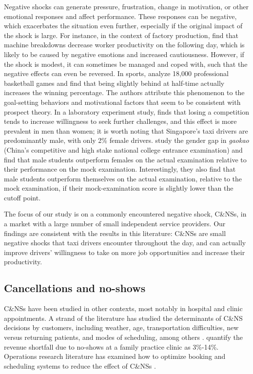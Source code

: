 \documentclass[reviewmode]{restud}
\begin{document}
Negative shocks can generate pressure, frustration, change in motivation, or other emotional responses and affect performance.  These responses can be negative, which exacerbates the situation even further, especially if the original impact of the shock is large. For instance, in the context of factory production, \citet{cai2017recover} find that machine breakdowns decrease worker productivity on the following day, which is likely to be caused by negative emotions and increased cautiousness. However, if the shock is modest, it can sometimes be managed and coped with, such that the negative effects can even be reversed. In sports, \citet{berger2011can} analyze 18,000 professional basketball games and find that being slightly behind at half-time actually increases the winning percentage. The authors attribute this phenomenon to the goal-setting behaviors and motivational factors that seem to be consistent with prospect theory. In a laboratory experiment study, \citet{buser2016impact}  finds that losing a competition tends to increase willingness to seek further challenges, and this effect is more prevalent in men than women; it is worth noting that Singapore's taxi drivers are predominantly male, with only 2\% female drivers. \citet{cai2016gender} study the gender gap in \emph{gaokao} (China's competitive and high stake national college entrance examination) and find that male students outperform females on the actual examination relative to their performance on the mock examination. Interestingly, they also find that male students outperform themselves on the actual examination, relative to the mock examination, if their mock-examination score is slightly lower than the cutoff point. 


The focus of our study is on a commonly encountered negative shock, C\&NSs, in a market with a large number of small independent service providers.
Our findings are consistent with the results in this literature: C\&NSs are small negative shocks that taxi drivers encounter throughout the day, and can actually improve drivers' willingness to take on more job opportunities and increase their productivity.

\subsection{Cancellations and no-shows}

C\&NSs have been studied in other contexts, most notably in hospital and clinic appointments. A strand of the literature has studied the determinants of C\&NS decisions by customers, including weather, age, transportation difficulties, new versus returning patients, and modes of scheduling, among others \citep{norris2014empirical}. \citet{moore2001time} quantify the revenue shortfall due to no-shows at a family practice clinic as 3\%-14\%. Operations research literature has examined how to optimize booking and scheduling systems to reduce the effect of C\&NSs \citep{feldman2014appointment,patrick2008reducing}.
\end{document}
